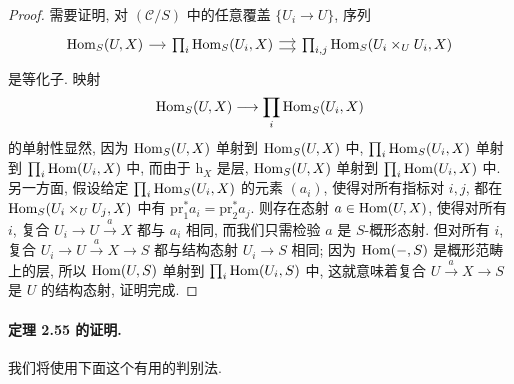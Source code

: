\begin{proof}
需要证明, 对 $(\mathcal C/S)$ 中的任意覆盖 $\{U_i\to U\}$, 序列
\[
\begin{tikzcd}[column sep=small]
\Hom_S(U,X)\arrow[r]&\prod_i\Hom_S(U_i,X)\arrow[r,shift left=.6ex]\arrow[r,shift right=.6ex]&\prod_{i,j}\Hom_S(U_i\times_UU_i,X)
\end{tikzcd}
\]
是等化子. 映射
\[
\operatorname{Hom}_S(U,X)\longrightarrow\prod_i\operatorname{Hom}_S(U_i,X)
\]
的单射性显然, 因为 $\operatorname{Hom}_S(U,X)$ 单射到 $\operatorname{Hom}_S(U,X)$ 中, $\prod_i\operatorname{Hom}_S(U_i,X)$ 单射到 $\prod_i\operatorname{Hom}(U_i,X)$ 中, 而由于 $\mathrm h_X$ 是层, $\operatorname{Hom}_S(U,X)$ 单射到 $\prod_i\operatorname{Hom}(U_i,X)$ 中.
另一方面, 假设给定 $\prod_i\operatorname{Hom}_S(U_i,X)$ 的元素 $(a_i)$, 使得对所有指标对 $i,j$, 都在 $\operatorname{Hom}_S(U_i\times_UU_j,X)$ 中有 $\mathrm{pr}_1^*a_i=\mathrm{pr}_2^*a_j$. 则存在态射 $a\in\operatorname{Hom}(U,X)$, 使得对所有 $i$, 复合 $U_i\to U\xrightarrow aX$ 都与 $a_i$ 相同, 而我们只需检验 $a$ 是 $S$-概形态射. 但对所有 $i$, 复合 $U_i\to U\xrightarrow aX\to S$ 都与结构态射 $U_i\to S$ 相同; 因为 $\operatorname{Hom}(-,S)$ 是概形范畴上的层, 所以 $\operatorname{Hom}(U,S)$ 单射到 $\prod_i\operatorname{Hom}(U_i,S)$ 中, 这就意味着复合 $U\xrightarrow aX\to S$ 是 $U$ 的结构态射, 证明完成.
\end{proof}

\paragraph{定理 2.55 的证明.}
我们将使用下面这个有用的判别法.


